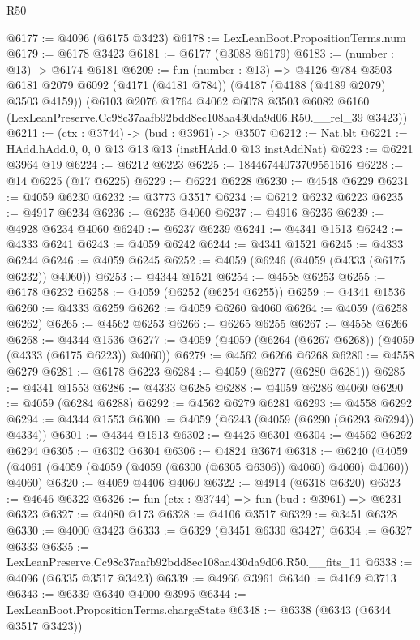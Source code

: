\begin{lexlean}{R50}
\begin{coremodule}
@6177 := @4096 (@6175 @3423)
@6178 := LexLeanBoot.PropositionTerms.num
@6179 := @6178 @3423
@6181 := @6177 (@3088 @6179)
@6183 := (number : @13) -> @6174 @6181
@6209 := fun (number : @13) =>
  @4126
    @784
    @3503
    @6181
    @2079
    @6092
    (@4171 (@4181 @784))
    (@4187 (@4188 (@4189 @2079) @3503 @4159))
    (@6103
      @2076
      @1764
      @4062
      @6078
      @3503
      @6082
      @6160
      (LexLeanPreserve.Cc98c37aafb92bdd8ec108aa430da9d06.R50.__rel_39 @3423))
@6211 := (ctx : @3744) -> (bud : @3961) -> @3507
@6212 := Nat.blt
@6221 := HAdd.hAdd.{0, 0, 0} @13 @13 @13 (instHAdd.{0} @13 instAddNat)
@6223 := @6221 @3964 @19
@6224 := @6212 @6223
@6225 := 18446744073709551616
@6228 := @14 @6225 (@17 @6225)
@6229 := @6224 @6228
@6230 := @4548 @6229
@6231 := @4059 @6230
@6232 := @3773 @3517
@6234 := @6212 @6232 @6223
@6235 := @4917 @6234
@6236 := @6235 @4060
@6237 := @4916 @6236
@6239 := @4928 @6234 @4060
@6240 := @6237 @6239
@6241 := @4341 @1513
@6242 := @4333 @6241
@6243 := @4059 @6242
@6244 := @4341 @1521
@6245 := @4333 @6244
@6246 := @4059 @6245
@6252 := @4059 (@6246 (@4059 (@4333 (@6175 @6232)) @4060))
@6253 := @4344 @1521
@6254 := @4558 @6253
@6255 := @6178 @6232
@6258 := @4059 (@6252 (@6254 @6255))
@6259 := @4341 @1536
@6260 := @4333 @6259
@6262 := @4059 @6260 @4060
@6264 := @4059 (@6258 @6262)
@6265 := @4562 @6253
@6266 := @6265 @6255
@6267 := @4558 @6266
@6268 := @4344 @1536
@6277 := @4059 (@4059 (@6264 (@6267 @6268)) (@4059 (@4333 (@6175 @6223)) @4060))
@6279 := @4562 @6266 @6268
@6280 := @4558 @6279
@6281 := @6178 @6223
@6284 := @4059 (@6277 (@6280 @6281))
@6285 := @4341 @1553
@6286 := @4333 @6285
@6288 := @4059 @6286 @4060
@6290 := @4059 (@6284 @6288)
@6292 := @4562 @6279 @6281
@6293 := @4558 @6292
@6294 := @4344 @1553
@6300 := @4059 (@6243 (@4059 (@6290 (@6293 @6294)) @4334))
@6301 := @4344 @1513
@6302 := @4425 @6301
@6304 := @4562 @6292 @6294
@6305 := @6302 @6304
@6306 := @4824 @3674
@6318 := @6240 (@4059 (@4061 (@4059 (@4059 (@4059 (@6300 (@6305 @6306)) @4060) @4060) @4060)) @4060)
@6320 := @4059 @4406 @4060
@6322 := @4914 (@6318 @6320)
@6323 := @4646 @6322
@6326 := fun (ctx : @3744) => fun (bud : @3961) => @6231 @6323
@6327 := @4080 @173
@6328 := @4106 @3517
@6329 := @3451 @6328
@6330 := @4000 @3423
@6333 := @6329 (@3451 @6330 @3427)
@6334 := @6327 @6333
@6335 := LexLeanPreserve.Cc98c37aafb92bdd8ec108aa430da9d06.R50.__fits_11
@6338 := @4096 (@6335 @3517 @3423)
@6339 := @4966 @3961
@6340 := @4169 @3713
@6343 := @6339 @6340 @4000 @3995
@6344 := LexLeanBoot.PropositionTerms.chargeState
@6348 := @6338 (@6343 (@6344 @3517 @3423))

\end{coremodule}
\end{lexlean}
